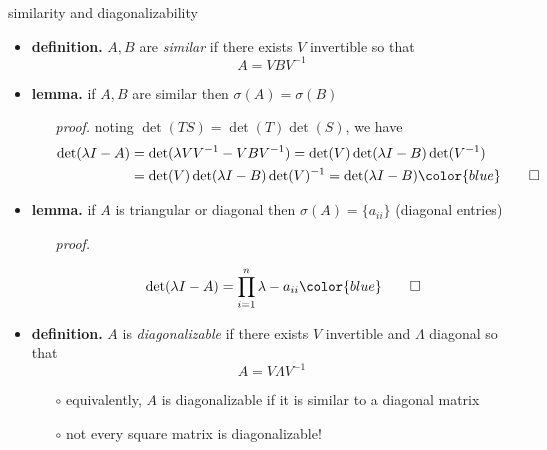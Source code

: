 \documentclass[10pt,hyperref]{beamer}
\newcommand{\bqed}{{\color{blue}\qed}}
\begin{document}
\begin{frame}{similarity and diagonalizability}

\begin{itemize}
\item \textbf{definition.} $A,B$ are \emph{similar} if there exists $V$ invertible so that
    $$A = V B V^{-1}$$
\item \textbf{lemma.} if $A,B$ are similar then $\sigma(A)=\sigma(B)$
    \begin{itemize}
    \item[\emph{proof.}] noting $\det(TS)=\det(T)\det(S)$, we have
\begin{align*}
\det(\lambda I - A) &= \det(\lambda VV^{-1} - V B V^{-1}) = \det(V) \det(\lambda I - B) \det(V^{-1}) \\
    &= \det(V) \det(\lambda I - B) \det(V)^{-1} = \det(\lambda I - B) \bqed
\end{align*}
    \end{itemize}
\item \textbf{lemma.} if $A$ is triangular or diagonal then $\sigma(A)=\{a_{ii}\}$  (diagonal entries)
    \begin{itemize}
    \item[\emph{proof.}]

    $$\det(\lambda I - A) = \prod_{i=1}^n \lambda-a_{ii} \bqed$$
    \end{itemize}
\item \textbf{definition.} $A$ is \emph{diagonalizable} if there exists $V$ invertible and $\Lambda$ diagonal so that
    $$A = V \Lambda V^{-1}$$

    \begin{itemize}
    \item[$\circ$] equivalently, $A$ is diagonalizable if it is similar to a diagonal matrix
    \item[$\circ$] not every square matrix is diagonalizable!
    \end{itemize}
\end{itemize}
\end{frame}
\end{document}

